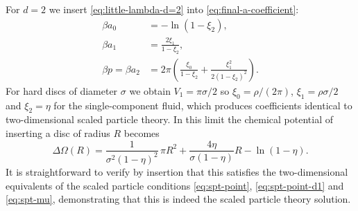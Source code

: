 \documentclass[11pt,twoside]{report}
\begin{document}
For $d=2$ we insert \eqref{eq:little-lambda-d=2} into \eqref{eq:final-a-coefficient}:
\begin{subequations}
  \begin{align}
    \beta a_0 &= -\ln{(1 - \xi_2)},
    \\
    \beta a_1 &= \frac{2 \xi_1}{1-\xi_2},
    \\
    \beta p =
    \beta a_2 &=
    2\pi \left(
    \frac{\xi_0}{1 - \xi_2}
    + \frac{\xi_1^2}{2(1-\xi_2)^2}
    \right).
  \end{align}
\end{subequations}
For hard discs of diameter $\sigma$ we obtain $V_1 = \pi \sigma / 2$ so $\xi_0 = \rho / (2\pi)$, $\xi_1 = \rho \sigma / 2$ and $\xi_2 = \eta$ for the single-component fluid, which produces coefficients identical to two-dimensional scaled particle theory.
In this limit the chemical potential of inserting a disc of radius $R$ becomes
\begin{equation*}
  \Delta\Omega(R)
  =
  \frac{1}{\sigma^2 (1-\eta)^2} \, \pi R^2
  + \frac{4 \eta}{\sigma (1 - \eta)} R
  - \ln{(1 - \eta)}.
\end{equation*}
It is straightforward to verify by insertion that this satisfies the two-dimensional equivalents of the scaled particle conditions \eqref{eq:spt-point}, \eqref{eq:spt-point-d1} and \eqref{eq:spt-mu}, demonstrating that this is indeed the scaled particle theory solution.
\end{document}
